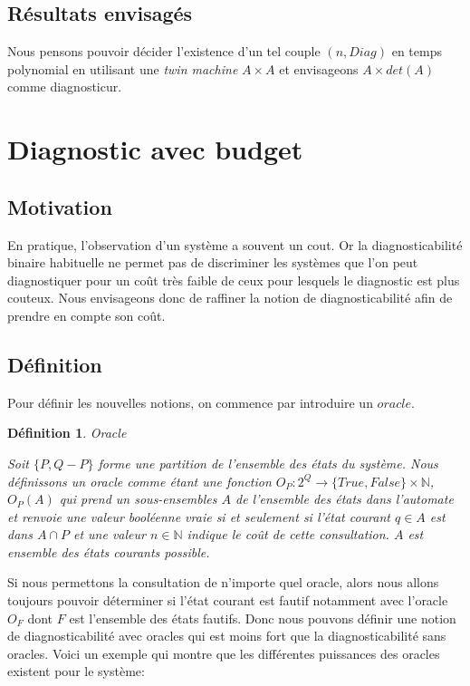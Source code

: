 \documentclass[a4paper,10pt]{article}
\newtheorem{mydef}{D\'efinition}
\begin{document}
\subsection{R\'esultats envisag\'es}

Nous pensons pouvoir d\'ecider l'existence d'un tel couple $(n, Diag)$ en temps polynomial en utilisant une \emph{twin machine} $A\times A$ et envisageons $A\times det(A)$ comme diagnosticur.


\section{Diagnostic avec budget}
\subsection{Motivation}

En pratique, l'observation d'un système a souvent un cout. Or la diagnosticabilité binaire habituelle ne permet pas de discriminer les systèmes que l'on peut diagnostiquer pour un coût très faible de ceux pour lesquels le diagnostic est plus couteux. Nous envisageons donc de raffiner la notion de diagnosticabilit\'e afin de prendre en compte son coût.


\subsection{D\'efinition}

Pour d\'efinir les nouvelles notions, on commence par introduire un $oracle$.

\begin{mydef}{Oracle}

  Soit $\{P,Q-P\}$ forme une partition de l'ensemble des \'etats du syst\`eme. Nous d\'efinissons un oracle comme \'etant une fonction $O_P: 2^Q \to \{True,False\} \times \mathbb{N}$, $O_P(A)$ qui prend un sous-ensembles $A$ de l'ensemble des \'etats dans l'automate et renvoie une valeur bool\'eenne vraie si et seulement si l'\'etat courant $q\in A$ est dans $A\cap P$ et une valeur $n \in \mathbb{N}$ indique le co\^ut de cette consultation. $A$ est ensemble des \'etats courants possible.

\end{mydef}

Si nous permettons la consultation de n'importe quel oracle, alors nous allons toujours pouvoir d\'eterminer si l'\'etat courant est fautif notamment avec l'oracle $O_F$ dont $F$ est l'ensemble des \'etats fautifs. Donc nous pouvons d\'efinir une notion de diagnosticabilit\'e avec oracles qui est moins fort que la diagnosticabilit\'e sans oracles. Voici un exemple qui montre que les diff\'erentes puissances des oracles existent pour le syst\`eme:
\end{document}

